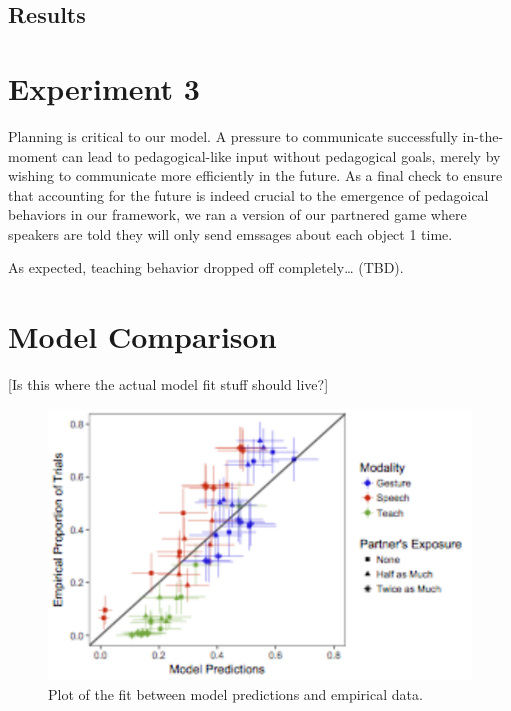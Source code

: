\documentclass[10pt, letterpaper]{article}
\newenvironment{CodeChunk}{}{}
\begin{document}
\subsection{Results}\label{results-3}

\section{Experiment 3}\label{experiment-3}

Planning is critical to our model. A pressure to communicate
successfully in-the-moment can lead to pedagogical-like input without
pedagogical goals, merely by wishing to communicate more efficiently in
the future. As a final check to ensure that accounting for the future is
indeed crucial to the emergence of pedagoical behaviors in our
framework, we ran a version of our partnered game where speakers are
told they will only send emssages about each object 1 time.

As expected, teaching behavior dropped off completely\ldots{} (TBD).

\section{Model Comparison}\label{model-comparison}

{[}Is this where the actual model fit stuff should live?{]}

\begin{CodeChunk}
\captionsetup{width=0.8\columnwidth}\begin{figure}[H]

{\centering \includegraphics{figs/image4-1} 

}

\caption[Plot of the fit between model predictions and empirical data]{Plot of the fit between model predictions and empirical data.}\label{fig:image4}
\end{figure}
\end{CodeChunk}
\end{document}
